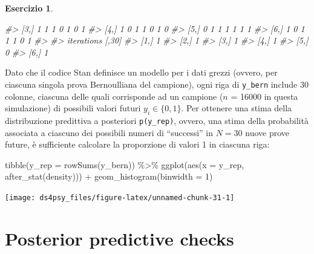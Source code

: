 \documentclass[
  11pt,
]{krantz}
\makeatletter
\newenvironment{Shaded}{\begin{snugshade}}{\end{snugshade}}
\newcommand{\AttributeTok}[1]{\textcolor[rgb]{0.61,0.61,0.61}{#1}}
\newcommand{\CommentTok}[1]{\textcolor[rgb]{0.37,0.37,0.37}{\textit{#1}}}
\newcommand{\DecValTok}[1]{\textcolor[rgb]{0.06,0.06,0.06}{#1}}
\newcommand{\FunctionTok}[1]{\textcolor[rgb]{0,0,0}{#1}}
\newcommand{\NormalTok}[1]{#1}
\newcommand{\SpecialCharTok}[1]{\textcolor[rgb]{0,0,0}{#1}}
\newenvironment{kframe}{%
\medskip{}
\setlength{\fboxsep}{.8em}
 \def\at@end@of@kframe{}%
 \ifinner\ifhmode%
  \def\at@end@of@kframe{\end{minipage}}%
  \begin{minipage}{\columnwidth}%
 \fi\fi%
 \def\FrameCommand##1{\hskip\@totalleftmargin \hskip-\fboxsep
 \colorbox{shadecolor}{##1}\hskip-\fboxsep
     \hskip-\linewidth \hskip-\@totalleftmargin \hskip\columnwidth}%
 \MakeFramed {\advance\hsize-\width
   \@totalleftmargin\z@ \linewidth\hsize
   \@setminipage}}%
 {\par\unskip\endMakeFramed%
 \at@end@of@kframe}
\renewenvironment{Shaded}{\begin{kframe}}{\end{kframe}}
\theoremstyle{definition}
\theoremstyle{definition}
\theoremstyle{definition}
\newtheorem{exercise}{Esercizio}[chapter]
\theoremstyle{definition}
\theoremstyle{remark}
\makeatother
\begin{document}
\begin{exercise}
\begin{Shaded}
\begin{Highlighting}[]
\CommentTok{\#\textgreater{}       [3,]     1     1     1     0     1     0     1}
\CommentTok{\#\textgreater{}       [4,]     1     0     1     1     0     1     0}
\CommentTok{\#\textgreater{}       [5,]     0     1     1     1     1     1     1}
\CommentTok{\#\textgreater{}       [6,]     1     0     1     1     1     0     1}
\CommentTok{\#\textgreater{}           }
\CommentTok{\#\textgreater{} iterations [,30]}
\CommentTok{\#\textgreater{}       [1,]     1}
\CommentTok{\#\textgreater{}       [2,]     1}
\CommentTok{\#\textgreater{}       [3,]     1}
\CommentTok{\#\textgreater{}       [4,]     1}
\CommentTok{\#\textgreater{}       [5,]     0}
\CommentTok{\#\textgreater{}       [6,]     1}
\end{Highlighting}
\end{Shaded}

Dato che il codice Stan definisce un modello per i dati grezzi (ovvero, per ciascuna singola prova Bernoulliana del campione), ogni riga di \texttt{y\_bern} include 30 colonne, ciascuna delle quali corrisponde ad un campione (\(n\) = 16000 in questa simulazione) di possibili valori futuri \(y_i \in \{0, 1\}\). Per ottenere una stima della distribuzione predittiva a posteriori \texttt{p(y\_rep)}, ovvero, una stima della probabilità associata a ciascuno dei possibili numeri di ``successi'' in \(N = 30\) nuove prove future, è sufficiente calcolare la proporzione di valori 1 in ciascuna riga:

\begin{Shaded}
\begin{Highlighting}[]
\FunctionTok{tibble}\NormalTok{(}\AttributeTok{y\_rep =} \FunctionTok{rowSums}\NormalTok{(y\_bern)) }\SpecialCharTok{\%\textgreater{}\%}
  \FunctionTok{ggplot}\NormalTok{(}\FunctionTok{aes}\NormalTok{(}\AttributeTok{x =}\NormalTok{ y\_rep, }\FunctionTok{after\_stat}\NormalTok{(density))) }\SpecialCharTok{+}
  \FunctionTok{geom\_histogram}\NormalTok{(}\AttributeTok{binwidth =} \DecValTok{1}\NormalTok{)}
\end{Highlighting}
\end{Shaded}

\begin{center}\texttt{[image: ds4psy\_files/figure-latex/unnamed-chunk-31-1]} \end{center}

\end{exercise}

\hypertarget{posterior-predictive-checks}{%
\section{Posterior predictive checks}\label{posterior-predictive-checks}}
\end{document}
